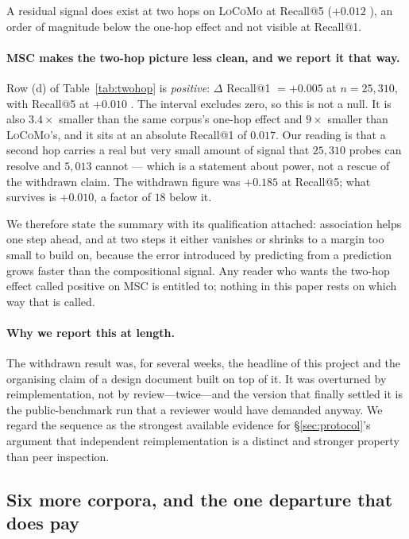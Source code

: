 A residual signal does exist at two hops on \textsc{LoCoMo} at Recall@5 ($+0.012$
), an order of magnitude below the one-hop effect and not visible at
Recall@1.

\paragraph{\textsc{MSC} makes the two-hop picture less clean, and we report it that way.}
Row (d) of Table~\ref{tab:twohop} is \emph{positive}: $\Delta$ Recall@1 $= +0.005$
 at $n{=}25{,}310$, with Recall@5 at $+0.010$ . The
interval excludes zero, so this is not a null. It is also $3.4\times$ smaller than the same
corpus's one-hop effect and $9\times$ smaller than \textsc{LoCoMo}'s, and it sits at an
absolute Recall@1 of $0.017$. Our reading is that a second hop carries a real but very small
amount of signal that $25{,}310$ probes can resolve and $5{,}013$ cannot --- which is a
statement about power, not a rescue of the withdrawn claim. The withdrawn figure was
$+0.185$ at Recall@5; what survives is $+0.010$, a factor of $18$ below it.

We therefore state the summary with its qualification attached: association helps one step
ahead, and at two steps it either vanishes or shrinks to a margin too small to build on,
because the error introduced by predicting from a prediction grows faster than the
compositional signal. Any reader who wants the two-hop effect called positive on
\textsc{MSC} is entitled to; nothing in this paper rests on which way that is called.

\paragraph{Why we report this at length.} The withdrawn result was, for several weeks, the
headline of this project and the organising claim of a design document built on top of it.
It was overturned by reimplementation, not by review---twice---and the version that finally
settled it is the public-benchmark run that a reviewer would have demanded anyway. We regard
the sequence as the strongest available evidence for \S\ref{sec:protocol}'s argument that
independent reimplementation is a distinct and stronger property than peer inspection.

\subsection{Six more corpora, and the one departure that does pay}
\label{sec:corpora}

